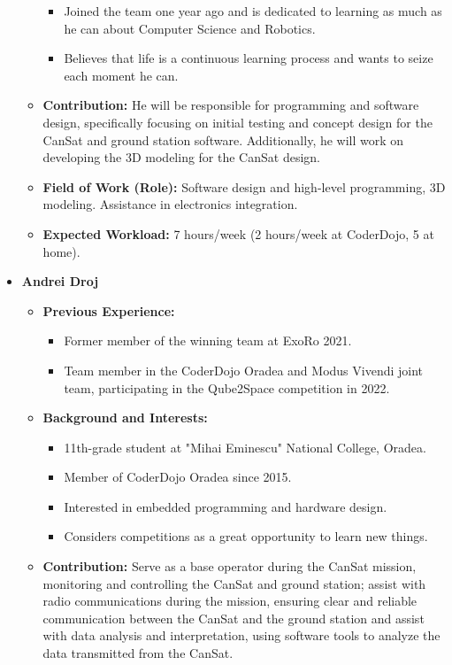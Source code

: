 \documentclass[11pt]{article}
\begin{document}
\begin{itemize}
\begin{itemize}[label=]
\begin{itemize}[label=]
            \item  Joined the team one year ago and is dedicated to learning as much as he can about Computer Science and Robotics.
            \item  Believes that life is a continuous learning process and wants to seize each moment he can.
        \end{itemize}
        \item[\faEdit] \textbf{Contribution:} He will be responsible for programming and software design, specifically focusing on initial testing and concept design for the CanSat and ground station software. Additionally, he will work on developing the 3D modeling for the CanSat design.
        \item[\faMicroscope] \textbf{Field of Work (Role):} Software design and high-level programming, 3D modeling. Assistance in electronics integration.
        \item[\faLaptopCode] \textbf{Expected Workload:} 7 hours/week (2 hours/week at CoderDojo, 5 at home).
    \end{itemize}
    \vspace{0.2 cm}
    \item[] \textbf{Andrei Droj}
    \begin{itemize}[label=]
        \item[\faCogs] \textbf{Previous Experience:} 
        \begin{itemize}[label=]
            \item Former member of the winning team at ExoRo 2021.
            \item Team member in the CoderDojo Oradea and Modus Vivendi joint team, participating in the Qube2Space competition in 2022.
        \end{itemize}
        \item[\faGraduationCap] \textbf{Background and Interests:} 
        \begin{itemize}[label=]
            \item 11th-grade student at "Mihai Eminescu" National College, Oradea.
            \item Member of CoderDojo Oradea since 2015.
            \item Interested in embedded programming and hardware design.
            \item Considers competitions as a great opportunity to learn new things.
        \end{itemize}
        \item[\faEdit] \textbf{Contribution:} Serve as a base operator during the CanSat mission, monitoring and controlling the CanSat and ground station; assist with radio communications during the mission, ensuring clear and reliable communication between the CanSat and the ground station and assist with data analysis and interpretation, using software tools to analyze the data transmitted from the CanSat.

\end{itemize}
\end{itemize}
\end{document}
